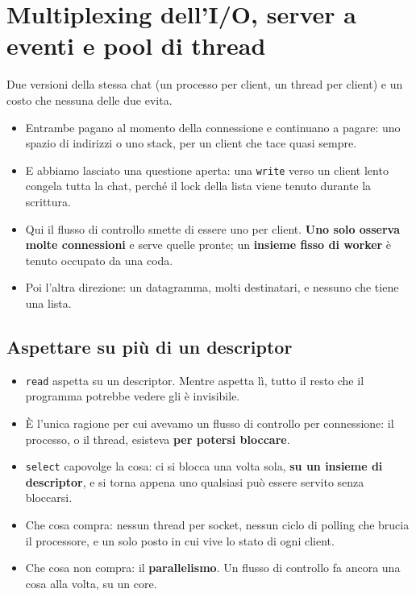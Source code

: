 \chapter{Multiplexing dell'I/O, server a eventi e pool di thread}

Due versioni della stessa chat (un processo per client, un thread per client) e un costo che nessuna delle due evita.
\begin{itemize}
    \item Entrambe pagano al momento della connessione e continuano a pagare: uno spazio di indirizzi o uno stack, per un
          client che tace quasi sempre.
    \item E abbiamo lasciato una questione aperta: una \texttt{write} verso un client lento congela tutta la chat, perché
          il lock della lista viene tenuto durante la scrittura.
    \item Qui il flusso di controllo smette di essere uno per client. \textbf{Uno solo osserva molte connessioni} e serve
          quelle pronte; un \textbf{insieme fisso di worker} è tenuto occupato da una coda.
    \item Poi l'altra direzione: un datagramma, molti destinatari, e nessuno che tiene una lista.
\end{itemize}

\section{Aspettare su più di un descriptor}

\begin{itemize}
    \item \texttt{read} aspetta su un descriptor. Mentre aspetta lì, tutto il resto che il programma potrebbe vedere gli è
          invisibile.
    \item È l'unica ragione per cui avevamo un flusso di controllo per connessione: il processo, o il thread, esisteva
          \textbf{per potersi bloccare}.
    \item \texttt{select} capovolge la cosa: ci si blocca una volta sola, \textbf{su un insieme di descriptor}, e si torna
          appena uno qualsiasi può essere servito senza bloccarsi.
    \item Che cosa compra: nessun thread per socket, nessun ciclo di polling che brucia il processore, e un solo posto in
          cui vive lo stato di ogni client.
    \item Che cosa non compra: il \textbf{parallelismo}. Un flusso di controllo fa ancora una cosa alla volta, su un core.
\end{itemize}

